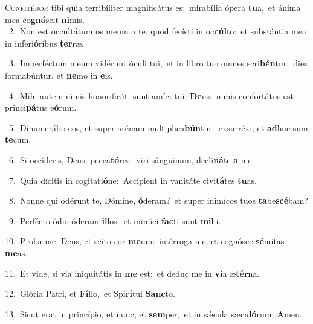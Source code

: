 \lettrine{\initial\textcolor{\initialcolor}{C}}{onfitébor} tibi quia terribíliter magnificátus es:~\dagger mirabília ópera \textbf{tu}\-a,~\star et ánima mea co\-\textbf{gnó}\-scit \textbf{ni}\-mis.\\
{\numbfont\textcolor{\numbcolor}{~2.}}~Non est occultátum os meum a te, quod fecísti in oc\-\textbf{cúl}\-to:~\star et substántia mea in inferi\-\textbf{ó}\-ribus \textbf{ter}\-ræ.\par
{\numbfont\textcolor{\numbcolor}{~3.}}~Imperféctum meum vidérunt óculi tui,~\dagger et in libro tuo omnes scri\-\textbf{bén}\-tur:~\star dies formabúntur, et \textbf{ne}\-mo in \textbf{e}\-is.\par
{\numbfont\textcolor{\numbcolor}{~4.}}~Mihi autem nimis honorificáti sunt amíci tui, \textbf{De}\-us:~\star nimis confortátus est princi\-\textbf{pá}\-tus e\-\textbf{ó}\-rum.\par
{\numbfont\textcolor{\numbcolor}{~5.}}~Dinumerábo eos, et super arénam multiplica\-\textbf{bún}\-tur:~\star exsurréxi, et \textbf{ad}\-huc sum \textbf{te}\-cum.\par
{\numbfont\textcolor{\numbcolor}{~6.}}~Si occíderis, Deus, pecca\-\textbf{tó}\-res:~\star viri sánguinum, decli\-\textbf{ná}\-te \textbf{a} me.\par
{\numbfont\textcolor{\numbcolor}{~7.}}~Quia dícitis in cogitati\-\textbf{ó}\-ne:~\star Accípient in vanitáte civi\-\textbf{tá}\-tes \textbf{tu}\-as.\par
{\numbfont\textcolor{\numbcolor}{~8.}}~Nonne qui odérunt te, Dómine, \textbf{ó}\-deram?~\star et super inimícos tuos \textbf{ta}\-be\-\textbf{scé}\-bam?\par
{\numbfont\textcolor{\numbcolor}{~9.}}~Perfécto ódio óderam \textbf{il}\-los:~\star et inimíci \textbf{fac}\-ti sunt \textbf{mi}\-hi.\par
{\numbfont\textcolor{\numbcolor}{10.}}~Proba me, Deus, et scito cor \textbf{me}\-um:~\star intérroga me, et cognósce \textbf{sé}\-mitas \textbf{me}\-as.\par
{\numbfont\textcolor{\numbcolor}{11.}}~Et vide, si via iniquitátis in \textbf{me} est:~\star et deduc me in \textbf{vi}\-a æ\-\textbf{tér}\-na.\par
{\numbfont\textcolor{\numbcolor}{12.}}~Glória Patri, et \textbf{Fí}\-lio,~\star et Spi\-\textbf{rí}\-tui \textbf{Sanc}\-to.\par
{\numbfont\textcolor{\numbcolor}{13.}}~Sicut erat in princípio, et nunc, et \textbf{sem}\-per,~\star et in sǽcula sæcu\-\textbf{ló}\-rum. \textbf{A}\-men.\par
